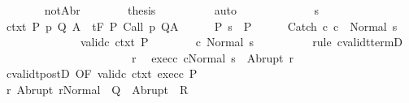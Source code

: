 \begin{isabellebody}
\isanewline
\ \ \ \ \ \ \isamarkupfalse%
\ notAbr\isanewline
\ \ \ \ \ \ \isamarkupfalse%
\ {\isacharquery}thesis\isanewline
\ \ \ \ \ \ \ \ \isamarkupfalse%
\ auto\isanewline
\ \ \ \ \isamarkupfalse%
\isanewline
\ \ \isamarkupfalse%
\isanewline
\ \ \ \ \isamarkupfalse%
\ s\isanewline
\ \ \ \ \isamarkupfalse%
\ ctxt{\isacharcolon}\ {\isachardoublequoteopen}{\isasymforall}{\isacharparenleft}P{\isacharcomma}\ p{\isacharcomma}\ Q{\isacharcomma}\ A{\isacharparenright}{\isasymin}{\isasymTheta}{\isachardot}\ {\isasymGamma}\ {\isasymTurnstile}\isactrlsub t\isactrlbsub {\isacharslash}F\isactrlesub \ P\ {\isacharparenleft}Call\ p{\isacharparenright}\ Q{\isacharcomma}A{\isachardoublequoteclose}\isanewline
\ \ \ \ \isamarkupfalse%
\ P{\isacharcolon}\ {\isachardoublequoteopen}s\ {\isasymin}\ P{\isachardoublequoteclose}\isanewline
\ \ \ \ \isamarkupfalse%
\ {\isachardoublequoteopen}{\isasymGamma}{\isasymturnstile}Catch\ c\ c\ {\isasymdown}\ Normal\ s{\isachardoublequoteclose}\ \ \isanewline
\ \ \ \ \isamarkupfalse%
\ {\isacharminus}\isanewline
\ \ \ \ \ \ \isamarkupfalse%
\ valid{\isacharunderscore}c{}\ ctxt\ P\isanewline
\ \ \ \ \ \ \isamarkupfalse%
\ {\isachardoublequoteopen}{\isasymGamma}{\isasymturnstile}c\ Normal\ s{\isachardoublequoteclose}\isanewline
\ \ \ \ \ \ \ \ \isamarkupfalse%
\ {\isacharparenleft}rule\ cvalidt{\isacharunderscore}termD{\isacharparenright}\isanewline
\ \ \ \ \ \ \isamarkupfalse%
\isanewline
\ \ \ \ \ \ \isacommand{{\isacharbraceleft}}\isamarkupfalse%
\isanewline
\ \ \ \ \ \ \ \ \isamarkupfalse%
\ r\ \isamarkupfalse%
\ exec{\isacharunderscore}c{}{\isacharcolon}\ {\isachardoublequoteopen}{\isasymGamma}{\isasymturnstile}{\isasymlangle}cNormal\ s{\isasymrangle}\ {\isasymRightarrow}\ Abrupt\ r{\isachardoublequoteclose}\isanewline
\ \ \ \ \ \ \ \ \isamarkupfalse%
\ cvalidt{\isacharunderscore}postD\ {\isacharbrackleft}OF\ valid{\isacharunderscore}c{}\ ctxt\ exec{\isacharunderscore}c{}\ P{\isacharbrackright}\isanewline
\ \ \ \ \ \ \ \ \isamarkupfalse%
\ r{\isacharcolon}\ {\isachardoublequoteopen}Abrupt\ r{\isasymin}Normal\ {\isacharbackquote}\ Q\ {\isasymunion}\ Abrupt\ {\isacharbackquote}\ R{\isachardoublequoteclose}\isanewline

\end{isabellebody}
